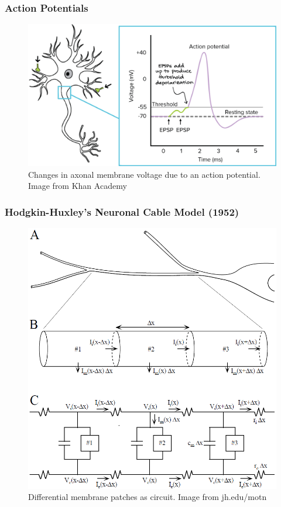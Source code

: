 \documentclass{beamer}
\begin{document}
\begin{frame}
\begin{columns}
\begin{column}{.5\textwidth}
    \end{column}
  \end{columns}
\end{frame}

\begin{frame}
\frametitle{Action Potentials}
\begin{figure}
\includegraphics[width=\textwidth]{actionpotential}
\caption{Changes in axonal membrane voltage due to an action potential. Image from Khan Academy}
\end{figure}
\end{frame}

\begin{frame}
\frametitle{Hodgkin-Huxley's Neuronal Cable Model (1952)}

\begin{figure}
\includegraphics[scale=0.35]{NeuronalCableModel}
\caption{Differential membrane patches as circuit. Image from jh.edu/motn}
\end{figure}

\end{frame}
\end{document}
